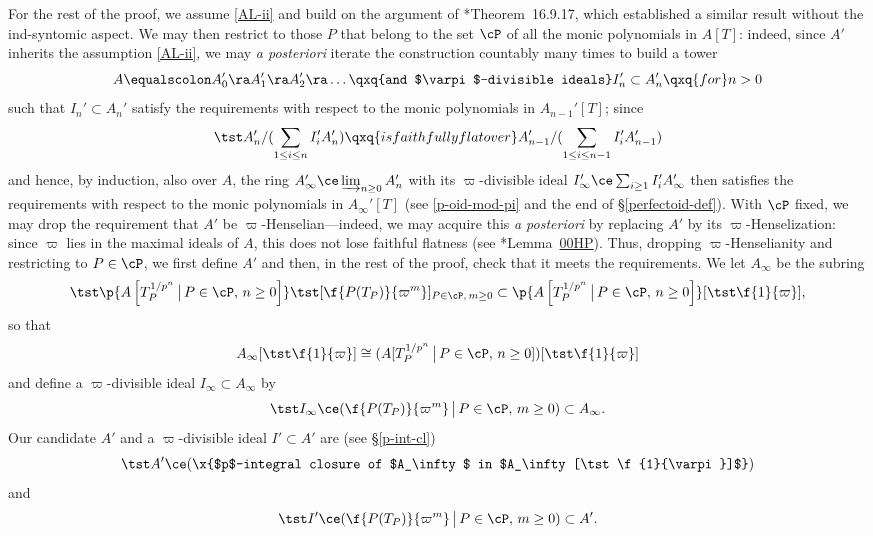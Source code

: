 For the rest of the proof, we assume \ref{AL-ii} and build on the argument of \cite{GR18}*{Theorem~16.9.17}, which established a similar result without the ind-syntomic aspect. We may then restrict to those $P$ that belong to the set $\cP$ of all the monic polynomials in $A[T]$: indeed, since $A'$ inherits the assumption \ref{AL-ii}, we may \emph{a posteriori} iterate the construction countably many times to build a tower
\[
A \equalscolon A_0' \ra A_1' \ra A_2' \ra \dotsc \qxq{and $\varpi$-divisible ideals} I_n' \subset A_n' \qxq{for} n > 0
\]
such that $I_n' \subset A_n'$ satisfy the requirements with respect to the monic polynomials in $A_{n - 1}'[T]$; since
\[
\tst A_n'/(\sum_{1 \le i \le n} I_i'A_n') \qxq{is faithfully flat over} A_{n - 1}'/(\sum_{1\le i \le n - 1} I_i'A_{n -1}')
\]
and hence, by induction, also over $A$, the ring $A_\infty' \ce \varinjlim_{n \ge 0} A_n'$ with its $\varpi$-divisible ideal $I_\infty' \ce \sum_{i \ge 1} I_i' A_\infty'$ then satisfies the requirements with respect to the monic polynomials in $A_\infty'[T]$ (see \eqref{p-oid-mod-pi} and the end of \S\ref{perfectoid-def}).  With $\cP$ fixed, we may drop the  requirement that $A'$ be $\varpi$-Henselian---indeed, we may acquire this \emph{a posteriori} by replacing $A'$ by its $\varpi$-Henselization: since $\varpi$ lies in the maximal ideals of $A$, this does not lose faithful flatness (see \cite{SP}*{Lemma~\href{https://stacks.math.columbia.edu/tag/00HP}{00HP}}). Thus, dropping $\varpi$-Henselianity and restricting to $P \in \cP$, we first define $A'$ and then, in the rest of the proof, check that it meets the requirements. We let $A_\infty$ be the subring
\[
\tst  \p{A\left[T_P^{1/p^n} \, \big\vert\, P \in \cP,\, n \ge 0\right]}\tst [\f{P(T_P)}{\varpi^m} ]_{ P \in \cP,\, m \ge 0} \subset \p{A\left[T_P^{1/p^n} \, \big\vert\, P \in \cP ,\, n \ge 0  \right]}[\tst\f{1}{\varpi}],
\]
so that
\[
A_\infty[\tst \f{1}{\varpi}] \cong (A[T_P^{1/p^n} \, \big\vert\, P \in \cP ,\, n \ge 0])[\tst\f{1}{\varpi}]
\]
and define a $\varpi$-divisible ideal $I_\infty \subset A_\infty$ by
\[
\tst I_\infty \ce (\f{P(T_P)}{\varpi^m} \,  \big\vert\, P \in \cP,\, m \ge 0) \subset A_\infty.
\]
Our candidate $A'$ and a $\varpi$-divisible ideal $I' \subset A'$ are (see \S\ref{p-int-cl})
\[
\tst A' \ce (\x{$p$-integral closure of $A_\infty$ in $A_\infty[\tst \f{1}{\varpi}]$})
\]
and
\[
\tst I' \ce (\f{P(T_P)}{\varpi^m} \,  \big\vert\, P \in \cP,\, m \ge 0) \subset A'.
\]
